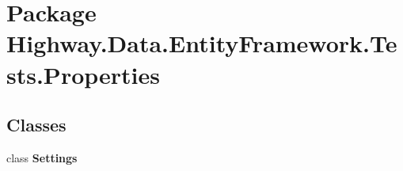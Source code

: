 \hypertarget{namespace_highway_1_1_data_1_1_entity_framework_1_1_tests_1_1_properties}{\section{Package Highway.\-Data.\-Entity\-Framework.\-Tests.\-Properties}
\label{namespace_highway_1_1_data_1_1_entity_framework_1_1_tests_1_1_properties}
}
\subsection*{Classes}
\begin{DoxyCompactItemize}
\item 
class {\bfseries Settings}
\end{DoxyCompactItemize}
